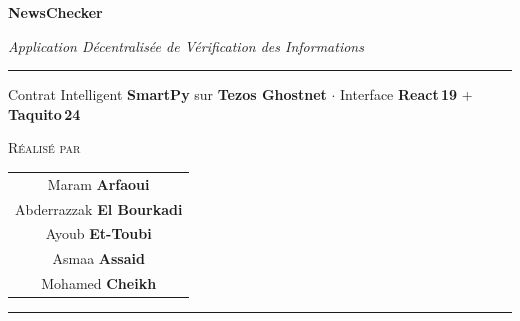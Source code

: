 \documentclass[12pt,a4paper]{article}
\begin{document}
\begin{titlepage}


\vspace*{3.5cm}
\begin{center}

{\fontsize{48}{56}\bfseries\color{darkbg} NewsChecker}

\vspace{0.4cm}
{\Large\color{primary}\itshape
  Application Décentralisée de Vérification des Informations}

\vspace{0.5cm}
\textcolor{primary!50}{\rule{11cm}{1.2pt}}

\vspace{0.5cm}
{\normalsize\color{darkbg!60}
  Contrat Intelligent \textbf{SmartPy} sur \textbf{Tezos Ghostnet}
  \enspace$\cdot$\enspace
  Interface \textbf{React\,19} + \textbf{Taquito\,24}}

\vspace{3.5cm}

{\normalsize\color{darkbg!50}\scshape Réalisé par}

\vspace{0.9cm}

{\large\color{darkbg}
\begin{tabular}{c}
  Maram \textbf{Arfaoui}\\[0.7em]
  Abderrazzak \textbf{El Bourkadi}\\[0.7em]
  Ayoub \textbf{Et-Toubi}\\[0.7em]
  Asmaa \textbf{Assaid}\\[0.7em]
  Mohamed \textbf{Cheikh}\\
\end{tabular}}

\vspace{3.2cm}
\textcolor{primary!50}{\rule{11cm}{0.6pt}}
\vspace{0.6cm}


\end{center}
\end{titlepage}
\end{document}
